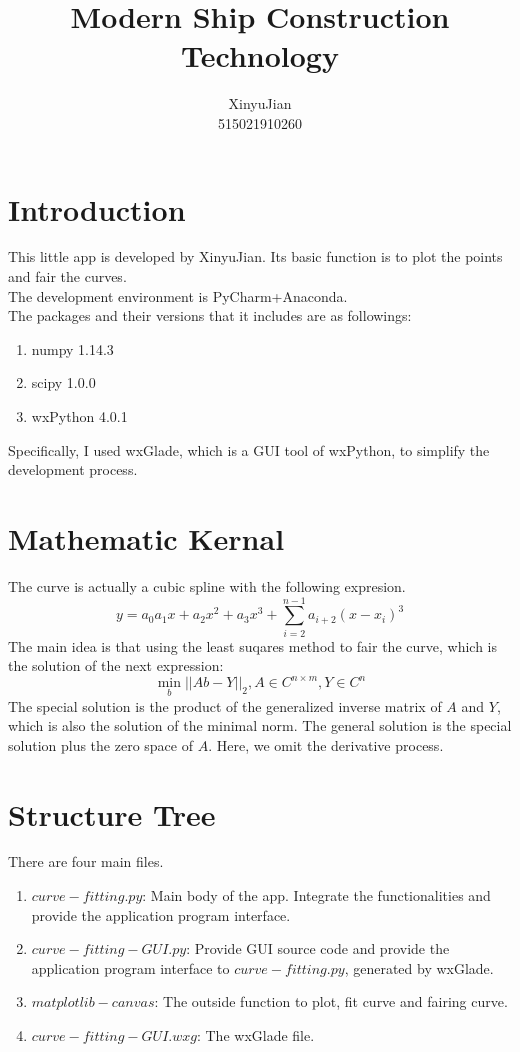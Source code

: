 \documentclass[a4paper]{ctexart}
\title{Modern Ship Construction Technology}
\author{XinyuJian\\515021910260}
\begin{document}
\maketitle
\section{Introduction}
This little app is developed by XinyuJian. Its basic function is to plot the points and fair the curves.\\ 
The development environment is PyCharm+Anaconda. \\
The packages and their versions that it includes are as followings:\\
\begin{enumerate}
	\item numpy 1.14.3
	\item scipy 1.0.0
	\item wxPython 4.0.1
\end{enumerate}
Specifically, I used wxGlade, which is a GUI tool of wxPython, to simplify the development process.

\section{Mathematic Kernal}
The curve is actually a cubic spline with the following expresion. 
\begin{equation}
	y=a_0 a_1x+a_2x^2+a_3x^3+\sum_{i=2}^{n-1}a_{i+2}(x-x_i)^3
\end{equation}
The main idea is that using the least suqares method to fair the curve, which is the solution of the next expression:
\begin{equation}
	\min_{b}||Ab-Y||_2, A\in C^{n\times m}, Y\in C^{n}
\end{equation}
The special solution is the product of the generalized inverse matrix of $A$ and $Y$, which is also the solution of the minimal norm. The general solution is the special solution plus the zero space of $A$. Here, we omit the derivative process.
\section{Structure Tree}
There are four main files.\\
\begin{enumerate}
	\item $curve-fitting.py$: Main body of the app. Integrate the functionalities and provide the application program interface.
	\item $curve-fitting-GUI.py$: Provide GUI source code and provide the application program interface to $curve-fitting.py$, generated by wxGlade.
	\item $matplotlib-canvas$: The outside function to plot, fit curve and fairing curve.
	\item $curve-fitting-GUI.wxg$: The wxGlade file.
\end{enumerate}
\end{document}
